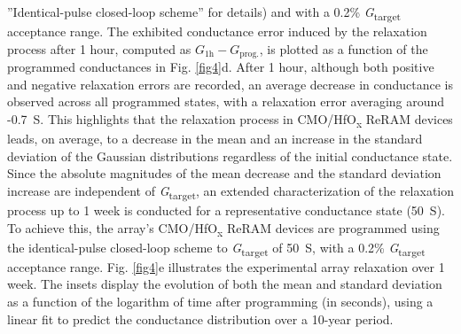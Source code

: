 ”Identical-pulse closed-loop scheme” for details) and with a 0.2\% \textit{G}\textsubscript{\textnormal{target}} acceptance range. The exhibited conductance error induced by the relaxation process after 1 hour, computed as \(G_{\mathrm{1h}} - G_{\mathrm{prog.}}\), is plotted as a function of the programmed conductances in Fig. \ref{fig4}d. After 1 hour, although both positive and negative relaxation errors are recorded, an average decrease in conductance is observed across all programmed states, with a relaxation error averaging around -0.7~\textmu S. This highlights that the relaxation process in CMO/HfO\textsubscript{\textnormal{x}} ReRAM devices leads, on average, to a decrease in the mean and an increase in the standard deviation of the Gaussian distributions regardless of the initial conductance state. Since the absolute magnitudes of the mean decrease and the standard deviation increase are independent of \textit{G}\textsubscript{\textnormal{target}}, an extended characterization of the relaxation process up to 1 week is conducted for a representative conductance state (50~\textmu S). To achieve this, the array's CMO/HfO\textsubscript{\textnormal{x}} ReRAM devices are programmed using the identical-pulse closed-loop scheme to \textit{G}\textsubscript{\textnormal{target}} of 50~\textmu S, with a 0.2\% \textit{G}\textsubscript{\textnormal{target}} acceptance range. Fig. \ref{fig4}e illustrates the experimental array relaxation over 1 week. The insets display the evolution of both the mean and standard deviation as a function of the logarithm of time after programming (in seconds), using a linear fit to predict the conductance distribution over a 10-year period. 
\\
\\
